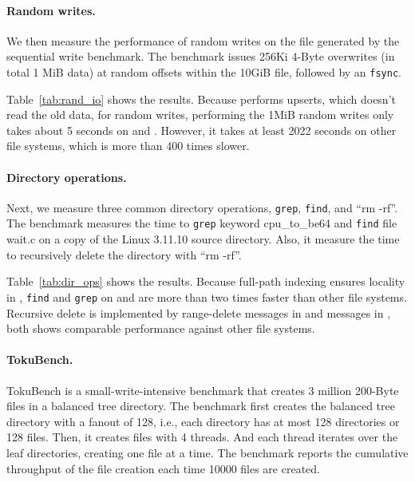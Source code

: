 \paragraph{Random writes.}

We then measure the performance of random writes on the file generated by the
sequential write benchmark.
The benchmark issues 256Ki 4-Byte overwrites (in total 1 MiB data) at random
offsets within the 10GiB file, followed by an \texttt{fsync}.

Table~\ref{tab:rand_io} shows the results.
Because \betrfs performs upserts, which doesn't read the old data, for random
writes, performing the 1MiB random writes only takes about 5 seconds on
\betrfsFour and \betrfsFive.
However, it takes at least 2022 seconds on other file systems, which is
more than 400 times slower.

\paragraph{Directory operations.}
Next, we measure three common directory operations,
\texttt{grep}, \texttt{find}, and ``rm -rf''.
The benchmark measures the time to \texttt{grep} keyword cpu\_to\_be64 and
\texttt{find} file wait.c on a copy of the Linux 3.11.10 source directory.
Also, it measure the time to recursively delete the directory with ``rm -rf''.

Table~\ref{tab:dir_ops} shows the results.
Because full-path indexing ensures locality in \betrfs, \texttt{find} and
\texttt{grep} on \betrfsFour and \betrfsFive are more than two times faster than
other file systems.
Recursive delete is implemented by range-delete messages in \betrfsFour and
\goto messages in \betrfsFive, both shows comparable performance against other
file systems.

\paragraph{TokuBench.}

TokuBench is a small-write-intensive benchmark that creates 3 million
200-Byte files in a balanced tree directory.
The benchmark first creates the balanced tree directory with a fanout of 128,
i.e., each directory has at most 128 directories or 128 files.
Then, it creates files with 4 threads.
And each thread iterates over the leaf directories, creating one file at a time.
The benchmark reports the cumulative throughput of the file creation each time
10000 files are created.

